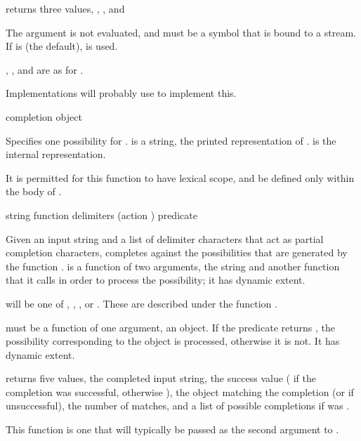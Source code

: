  returns three values, ,
, and 

The  argument is not evaluated, and must be a symbol that is bound
to a stream.  If  is  (the default),  is
used.

, , and 
are as for .

Implementations will probably use  to implement
this.

 {completion object}

Specifies one possibility for .  
is a string, the printed representation of .   is the
internal representation.

It is permitted for this function to have lexical scope, and be defined only
within the body of .


 {string function delimiters
                                  \key (action ) predicate}

Given an input string  and a list of delimiter characters
 that act as partial completion characters,
 completes against the possibilities that are
generated by the function .   is a function of two
arguments, the string  and another function that it calls in order
to process the possibility; it has dynamic extent.

 will be one of , ,
, or .  These are described under the
function .

 must be a function of one argument, an object.  If the predicate
returns , the possibility corresponding to the object is processed,
otherwise it is not.  It has dynamic extent.

 returns five values, the completed input string,
the success value ( if the completion was successful, otherwise
), the object matching the completion (or  if unsuccessful),
the number of matches, and a list of possible completions if  was
.

This function is one that will typically be passed as the second argument to
.

